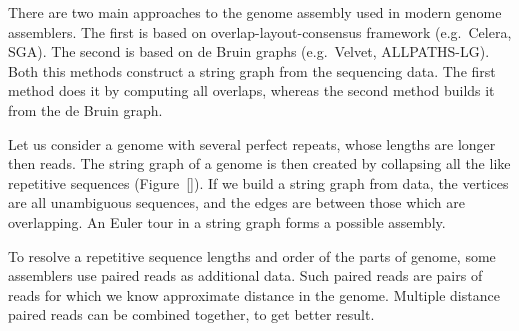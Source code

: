 There are two main approaches to the genome assembly used in modern genome assemblers. The first is based on overlap-layout-consensus framework (e.g.\ Celera\cite{myers2000celera}, SGA\cite{simpson2010sga}). The second is based on de Bruin graphs (e.g.\ Velvet\cite{zerbino2008velvet}, ALLPATHS-LG\cite{gnerre2011allpaths}). Both this methods construct a string graph\cite{myers2005stringgraph} from the sequencing data. The first method does it by computing all overlaps, whereas the second method builds it from the de Bruin graph.

Let us consider a genome with several perfect repeats, whose lengths are longer then reads. The string graph of a genome is then created by collapsing all the like repetitive sequences (Figure~\ref{}). If we build a string graph from data, the vertices are all unambiguous sequences, and the edges are between those which are overlapping. An Euler tour in a string graph forms a possible assembly.

To resolve a repetitive sequence lengths and order of the parts of genome, some assemblers use paired reads as additional data. Such paired reads are pairs of reads for which we know approximate distance in the genome. Multiple distance paired reads can be combined together, to get better result.
